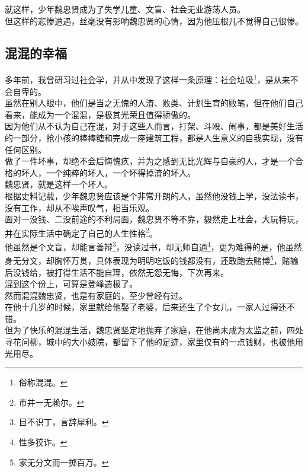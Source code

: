 \begin{multicols}{\theparacolNo}
就这样，少年魏忠贤成为了失学儿童、文盲、社会无业游荡人员。\\

但这样的悲惨遭遇，丝毫没有影响魏忠贤的心情，因为他压根儿不觉得自己很惨。\\

\subsection{混混的幸福}
多年前，我曾研习过社会学，并从中发现了这样一条原理：社会垃圾\footnote{俗称混混。}，是从来不会自卑的。\\

虽然在别人眼中，他们是当之无愧的人渣、败类、计划生育的败笔，但在他们自己看来，能成为一个混混，是极其光荣且值得骄傲的。\\

因为他们从不认为自己在混，对于这些人而言，打架、斗殴、闹事，都是美好生活的一部分，抢小孩的棒棒糖和完成一座建筑工程，都是人生意义的自我实现，没有任何区别。\\

做了一件坏事，却绝不会后悔愧疚，并为之感到无比光辉与自豪的人，才是一个合格的坏人，一个纯粹的坏人，一个坏得掉渣的坏人。\\

魏忠贤，就是这样一个坏人。\\

根据史料记载，少年魏忠贤应该是个非常开朗的人，虽然他没钱上学，没法读书，没有工作，却从不唉声叹气，相当乐观。\\

面对一没钱、二没前途的不利局面，魏忠贤不等不靠，毅然走上社会，大玩特玩，并在实际生活中确定了自己的人生性格\footnote{市井一无赖尔。}。\\

他虽然是个文盲，却能言善辩\footnote{目不识丁，言辞犀利。}，没读过书，却无师自通\footnote{性多狡诈。}，更为难得的是，他虽然身无分文，却胸怀万贯，具体表现为明明吃饭的钱都没有，还敢跑去赌博\footnote{家无分文而一掷百万。}，赌输后没钱给，被打得生活不能自理，依然无怨无悔，下次再来。\\

混到这个份上，可算是登峰造极了。\\

然而混混魏忠贤，也是有家庭的，至少曾经有过。\\

在他十几岁的时候，家里就给他娶了老婆，后来还生了个女儿，一家人过得还不错。\\

但为了快乐的混混生活，魏忠贤坚定地抛弃了家庭，在他尚未成为太监之前，四处寻花问柳，城中的大小妓院，都留下了他的足迹，家里仅有的一点钱财，也被他用光用尽。\\


\end{multicols}
